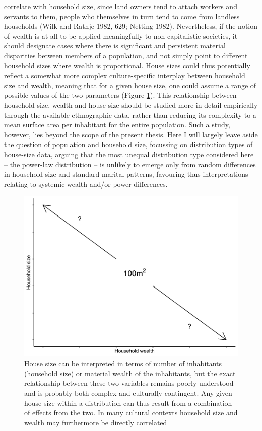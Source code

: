 \documentclass[
  12pt,
  a4paper, twoside]{book}
\begin{document}
correlate with household size, since land owners tend to attach workers and servants to them, people who themselves in turn tend to come from landless households (Wilk and Rathje 1982, 629; Netting 1982). Nevertheless, if the notion of wealth is at all to be applied meaningfully to non-capitalistic societies, it should designate cases where there is significant and persistent material disparities between members of a population, and not simply point to different household sizes where wealth is proportional. House sizes could thus potentially reflect a somewhat more complex culture-specific interplay between household size and wealth, meaning that for a given house size, one could assume a range of possible values of the two parameters (Figure \ref{fig:04-intro}). This relationship between household size, wealth and house size should be studied more in detail empirically through the available ethnographic data, rather than reducing its complexity to a mean surface area per inhabitant for the entire population. Such a study, however, lies beyond the scope of the present thesis. Here I will largely leave aside the question of population and household size, focussing on distribution types of house-size data, arguing that the most unequal distribution type considered here -- the power-law distribution -- is unlikely to emerge only from random differences in household size and standard marital patterns, favouring thus interpretations relating to systemic wealth and/or power differences.



\begin{figure}

{\centering \includegraphics[width=0.9\linewidth]{bookdown-demo_files/figure-latex/04-intro-1} 

}

\caption[House size, household size and wealth]{House size can be interpreted in terms of number of inhabitants (household size) or material wealth of the inhabitants, but the exact relationship between these two variables remains poorly understood and is probably both complex and culturally contingent. Any given house size within a distribution can thus result from a combination of effects from the two. In many cultural contexts household size and wealth may furthermore be directly correlated}\label{fig:04-intro}
\end{figure}
\end{document}
